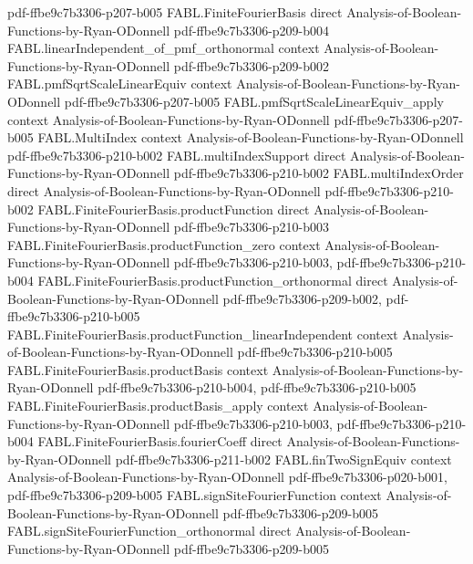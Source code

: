 \begin{theorem}
  {pdf-ffbe9c7b3306-p207-b005}
\proofstep
  {FABL.FiniteFourierBasis}
  {direct}
  {Analysis-of-Boolean-Functions-by-Ryan-ODonnell}
  {pdf-ffbe9c7b3306-p209-b004}
\proofstep
  {FABL.linearIndependent_of_pmf_orthonormal}
  {context}
  {Analysis-of-Boolean-Functions-by-Ryan-ODonnell}
  {pdf-ffbe9c7b3306-p209-b002}
\proofstep
  {FABL.pmfSqrtScaleLinearEquiv}
  {context}
  {Analysis-of-Boolean-Functions-by-Ryan-ODonnell}
  {pdf-ffbe9c7b3306-p207-b005}
\proofstep
  {FABL.pmfSqrtScaleLinearEquiv_apply}
  {context}
  {Analysis-of-Boolean-Functions-by-Ryan-ODonnell}
  {pdf-ffbe9c7b3306-p207-b005}
\proofstep
  {FABL.MultiIndex}
  {context}
  {Analysis-of-Boolean-Functions-by-Ryan-ODonnell}
  {pdf-ffbe9c7b3306-p210-b002}
\proofstep
  {FABL.multiIndexSupport}
  {direct}
  {Analysis-of-Boolean-Functions-by-Ryan-ODonnell}
  {pdf-ffbe9c7b3306-p210-b002}
\proofstep
  {FABL.multiIndexOrder}
  {direct}
  {Analysis-of-Boolean-Functions-by-Ryan-ODonnell}
  {pdf-ffbe9c7b3306-p210-b002}
\proofstep
  {FABL.FiniteFourierBasis.productFunction}
  {direct}
  {Analysis-of-Boolean-Functions-by-Ryan-ODonnell}
  {pdf-ffbe9c7b3306-p210-b003}
\proofstep
  {FABL.FiniteFourierBasis.productFunction_zero}
  {context}
  {Analysis-of-Boolean-Functions-by-Ryan-ODonnell}
  {pdf-ffbe9c7b3306-p210-b003,
    pdf-ffbe9c7b3306-p210-b004}
\proofstep
  {FABL.FiniteFourierBasis.productFunction_orthonormal}
  {direct}
  {Analysis-of-Boolean-Functions-by-Ryan-ODonnell}
  {pdf-ffbe9c7b3306-p209-b002,
    pdf-ffbe9c7b3306-p210-b005}
\proofstep
  {FABL.FiniteFourierBasis.productFunction_linearIndependent}
  {context}
  {Analysis-of-Boolean-Functions-by-Ryan-ODonnell}
  {pdf-ffbe9c7b3306-p210-b005}
\proofstep
  {FABL.FiniteFourierBasis.productBasis}
  {context}
  {Analysis-of-Boolean-Functions-by-Ryan-ODonnell}
  {pdf-ffbe9c7b3306-p210-b004,
    pdf-ffbe9c7b3306-p210-b005}
\proofstep
  {FABL.FiniteFourierBasis.productBasis_apply}
  {context}
  {Analysis-of-Boolean-Functions-by-Ryan-ODonnell}
  {pdf-ffbe9c7b3306-p210-b003,
    pdf-ffbe9c7b3306-p210-b004}
\proofstep
  {FABL.FiniteFourierBasis.fourierCoeff}
  {direct}
  {Analysis-of-Boolean-Functions-by-Ryan-ODonnell}
  {pdf-ffbe9c7b3306-p211-b002}
\proofstep
  {FABL.finTwoSignEquiv}
  {context}
  {Analysis-of-Boolean-Functions-by-Ryan-ODonnell}
  {pdf-ffbe9c7b3306-p020-b001,
    pdf-ffbe9c7b3306-p209-b005}
\proofstep
  {FABL.signSiteFourierFunction}
  {context}
  {Analysis-of-Boolean-Functions-by-Ryan-ODonnell}
  {pdf-ffbe9c7b3306-p209-b005}
\proofstep
  {FABL.signSiteFourierFunction_orthonormal}
  {direct}
  {Analysis-of-Boolean-Functions-by-Ryan-ODonnell}
  {pdf-ffbe9c7b3306-p209-b005}

\end{theorem}
